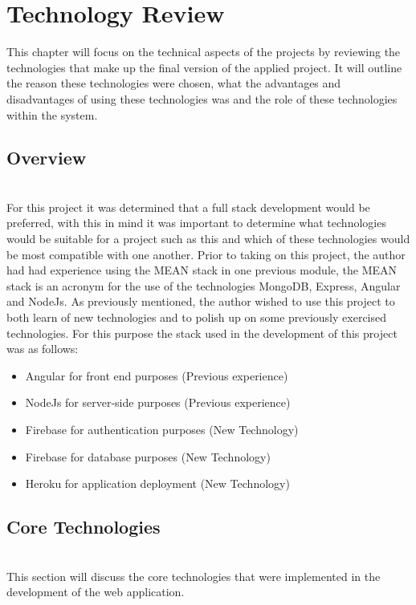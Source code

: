 \chapter{Technology Review}
This chapter will focus on the technical aspects of the projects by reviewing the technologies that make up the final version of the applied project. It will outline the reason these technologies were chosen, what the advantages and disadvantages of using these technologies was and the role of these technologies within the system.

\section{Overview} \\
For this project it was determined that a full stack development would be preferred, with this in mind it was important to determine what technologies would be suitable for a project such as this and which of these technologies would be most compatible with one another. Prior to taking on this project, the author had had experience using the MEAN stack in one previous module, the MEAN stack is an acronym for the use of the technologies MongoDB, Express, Angular and NodeJs. As previously mentioned, the author wished to use this project to both learn of new technologies and to polish up on some previously exercised technologies. For this purpose the stack used in the development of this project was as follows: \\
\begin{itemize}
    \item Angular for front end purposes (Previous experience)
    \item NodeJs for server-side purposes (Previous experience)
    \item Firebase for authentication purposes (New Technology)
    \item Firebase for database purposes (New Technology)
    \item Heroku for application deployment (New Technology)
\end{itemize}

\section{Core Technologies} \\
This section will discuss the core technologies that were implemented in the development of the web application. \\ \\

